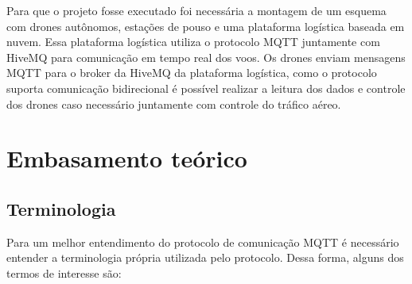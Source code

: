 \documentclass[12pt, a4paper]{article}
\begin{document}
        Para que o projeto fosse executado foi necessária a montagem de um esquema com drones autônomos, estações de pouso e uma plataforma logística baseada em nuvem. Essa plataforma logística utiliza o protocolo MQTT juntamente com HiveMQ para comunicação em tempo real dos voos. Os drones enviam mensagens MQTT para o broker da HiveMQ da plataforma logística, como o protocolo suporta comunicação bidirecional é possível realizar a leitura dos dados e controle dos drones caso necessário juntamente com controle do tráfico aéreo.
        \cite{HiveMQDrone}

\cleardoublepage

\section{Embasamento teórico}

\subsection{Terminologia}\label{Terminologia}

Para um melhor entendimento do protocolo de comunicação MQTT é necessário entender a terminologia própria utilizada pelo protocolo. Dessa forma, alguns dos termos de interesse são:
\end{document}
